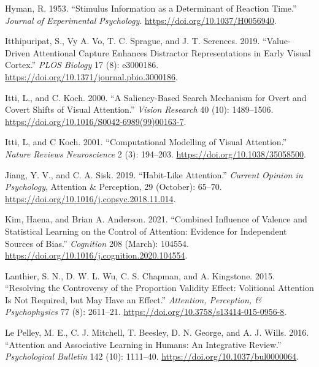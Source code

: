 \documentclass[11pt,halfline,a4paper,]{ouparticle}
\newlength{\cslhangindent}
\newlength{\cslentryspacingunit} %
\newenvironment{CSLReferences}[2] %
 {%
  \setlength{\parindent}{0pt}
  \ifodd #1
  \let\oldpar\par
  \def\par{\hangindent=\cslhangindent\oldpar}
  \fi
  \setlength{\parskip}{#2\cslentryspacingunit}
 }%
 {}
\begin{document}
\begin{CSLReferences}{1}{0}
\leavevmode{}%
Hyman, R. 1953. {``Stimulus Information as a Determinant of Reaction Time.''} \emph{Journal of Experimental Psychology}. \url{https://doi.org/10.1037/H0056940}.

\leavevmode{}%
Itthipuripat, S., Vy A. Vo, T. C. Sprague, and J. T. Serences. 2019. {``Value-Driven Attentional Capture Enhances Distractor Representations in Early Visual Cortex.''} \emph{PLOS Biology} 17 (8): e3000186. \url{https://doi.org/10.1371/journal.pbio.3000186}.

\leavevmode{}%
Itti, L., and C. Koch. 2000. {``A Saliency-Based Search Mechanism for Overt and Covert Shifts of Visual Attention.''} \emph{Vision Research} 40 (10): 1489--1506. \url{https://doi.org/10.1016/S0042-6989(99)00163-7}.

\leavevmode{}%
Itti, L, and C Koch. 2001. {``Computational Modelling of Visual Attention.''} \emph{Nature Reviews Neuroscience} 2 (3): 194--203. \url{https://doi.org/10.1038/35058500}.

\leavevmode{}%
Jiang, Y. V., and C. A. Sisk. 2019. {``Habit-Like Attention.''} \emph{Current Opinion in Psychology}, Attention \& {Perception}, 29 (October): 65--70. \url{https://doi.org/10.1016/j.copsyc.2018.11.014}.

\leavevmode{}%
Kim, Haena, and Brian A. Anderson. 2021. {``Combined Influence of Valence and Statistical Learning on the Control of Attention: {Evidence} for Independent Sources of Bias.''} \emph{Cognition} 208 (March): 104554. \url{https://doi.org/10.1016/j.cognition.2020.104554}.

\leavevmode{}%
Lanthier, S. N., D. W. L. Wu, C. S. Chapman, and A. Kingstone. 2015. {``Resolving the Controversy of the Proportion Validity Effect: {Volitional} Attention Is Not Required, but May Have an Effect.''} \emph{Attention, Perception, \& Psychophysics} 77 (8): 2611--21. \url{https://doi.org/10.3758/s13414-015-0956-8}.

\leavevmode{}%
Le Pelley, M. E., C. J. Mitchell, T. Beesley, D. N. George, and A. J. Wills. 2016. {``Attention and Associative Learning in Humans: {An} Integrative Review.''} \emph{Psychological Bulletin} 142 (10): 1111--40. \url{https://doi.org/10.1037/bul0000064}.


\end{CSLReferences}
\end{document}
